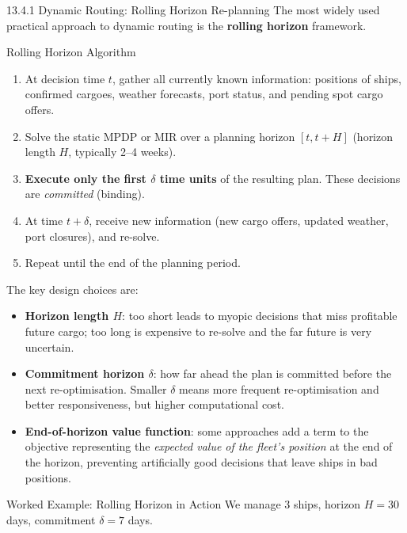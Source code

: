 \documentclass[aspectratio=169,10pt]{beamer}
\begin{document}
\begin{frame}[allowframebreaks]{13.4.1 Dynamic Routing: Rolling Horizon Re-planning}
  The most widely used practical approach to dynamic routing is the
  \textbf{rolling horizon} framework.

  \medskip
  \begin{block}{Rolling Horizon Algorithm}
    \begin{enumerate}
      \item At decision time $t$, gather all currently known information:
            positions of ships, confirmed cargoes, weather forecasts,
            port status, and pending spot cargo offers.
      \item Solve the static MPDP or MIR over a planning horizon $[t, t+H]$
            (horizon length $H$, typically 2--4 weeks).
      \item \textbf{Execute only the first $\delta$ time units} of the
            resulting plan.  These decisions are \emph{committed} (binding).
      \item At time $t + \delta$, receive new information (new cargo offers,
            updated weather, port closures), and re-solve.
      \item Repeat until the end of the planning period.
    \end{enumerate}
  \end{block}

  The key design choices are:
  \begin{itemize}
    \item \textbf{Horizon length $H$}: too short leads to myopic decisions
          that miss profitable future cargo; too long is expensive to re-solve
          and the far future is very uncertain.
    \item \textbf{Commitment horizon $\delta$}: how far ahead the plan is
          committed before the next re-optimisation.  Smaller $\delta$ means
          more frequent re-optimisation and better responsiveness, but higher
          computational cost.
    \item \textbf{End-of-horizon value function}: some approaches add a term
          to the objective representing the \emph{expected value of the
          fleet's position} at the end of the horizon, preventing
          artificially good decisions that leave ships in bad positions.
  \end{itemize}

  \begin{exampleblock}{Worked Example: Rolling Horizon in Action}
    We manage 3 ships, horizon $H = 30$ days, commitment $\delta = 7$ days.


\end{exampleblock}
\end{frame}
\end{document}
